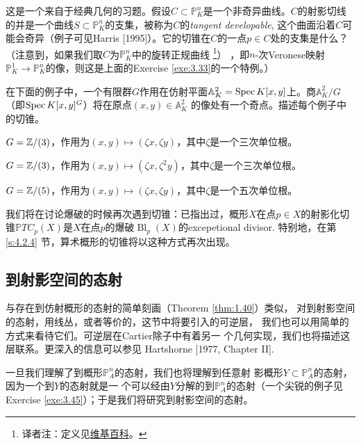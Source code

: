 \begin{exe}\label{exe:3.34}
这是一个来自于经典几何的习题。假设$C\subset \mathbb P_K^n$是一个非奇异曲线。$C$的射影切线的并是一个曲线$S\subset \mathbb P_K^n$的支集，被称为$C$的\textit{tangent developable}, 这个曲面沿着$C$可能会奇异（例子可见Harris [1995]）。它的切锥在$C$的一点$p\in C$处的支集是什么？（注意到，如果我们取$C$为$\mathbb P_K^n$中的旋转正规曲线%
\footnote{译者注：定义见\href{https://en.wikipedia.org/wiki/Rational_normal_curve}{维基百科}。}）%
，即$n$-次Veronese映射$\mathbb P_K^1\to\mathbb P_K^n$的像，则这是上面的Exercise \ref{exe:3.33}的一个特例。）
\end{exe}

\begin{exe}\label{exe:3.35}
在下面的例子中，一个有限群$G$作用在仿射平面$\mathbb A^2_K=\operatorname{Spec} K[x,y]$上。商$\mathbb A_K^2/G$（即$\operatorname{Spec} K[x,y]^G$）将在原点$(x,y)\in \mathbb A_K^2$ %
的像处有一个奇点。描述每个例子中的切锥。
\begin{compactenum}[(a)]
\item $G=\mathbb{Z}/(3)$，作用为$(x,y)\mapsto (\zeta x,\zeta y)$，其中$\zeta$是一个三次单位根。
\item $G=\mathbb{Z}/(3)$，作用为$(x,y)\mapsto (\zeta x,\zeta^2 y)$，其中$\zeta$是一个三次单位根。
\item $G=\mathbb{Z}/(5)$，作用为$(x,y)\mapsto (\zeta x,\zeta y)$，其中$\zeta$是一个五次单位根。
\end{compactenum}
\end{exe}

我们将在讨论爆破的时候再次遇到切锥：已指出过，概形$X$在点$p\in X$的射影化切锥$\mathbb PTC_p(X)$是$X$在点$p$的爆破$\operatorname{Bl}_p(X)$的excepetional divisor. 特别地，在第 \ref{s:4.2.4} 节，算术概形的切锥将以这种方式再次出现。

\subsection{到射影空间的态射} \label{s:3.2.5}

与存在到仿射概形的态射的简单刻画（Theorem \ref{thm:1.40}）类似，
对到射影空间的态射，用线丛，或者等价的，这节中将要引入的可逆层，
我们也可以用简单的方式来看待它们。可逆层在Cartier除子中有着另一
个几何实现，我们也将描述这层联系。更深入的信息可以参见
Hartshorne [1977, Chapter II].

一旦我们理解了到概形$\mathbb P_A^n$的态射，我们也将理解到任意射  
影概形$Y\subset \mathbb P_A^n$的态射，因为一个到$Y$的态射就是一
个可以经由$Y$分解的到$\mathbb P_A^n$的态射（一个尖锐的例子见
Exercise \ref{exe:3.45}）；于是我们将研究到射影空间的态射。

